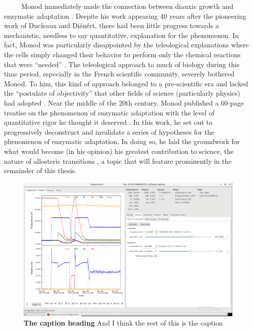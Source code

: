 \documentclass[12pt]{caltech_thesis}
\begin{document}
~~~~~Monod immediately made the connection between diauxic growth and
enzymatic adaptation \autocite{loison2013}. Despite his work appearing
40 years after the pioneering work of Ducleaux and Diénért, there had
been little progress towards a mechanistic, needless to say
quantitative, explanation for the phenomenon. In fact, Monod was
particularly disappointed by the teleological explanations where the
cells simply changed their behavior to perform only the chemical
reactions that were ``needed'' \autocite{loison2013}. The teleological
approach to much of biology during this time period, especially in the
French scientific community, severely bothered Monod. To him, this kind
of approach belonged to a pre-scientific era and lacked the ``postulate
of objectivity'' that other fields of science (particularly physics) had
adopted \autocite{loison2013}. Near the middle of the 20th century,
Monod published a 60-page treatise on the phenomenon of enzymatic
adaptation with the level of quantitative rigor he thought it deserved
\autocite{monod1947}. In this work, he set out to progressively
deconstruct and invalidate a series of hypotheses for the phenomenon of
enzymatic adaptation. In doing so, he laid the groundwork for what would
become (in his opinion) his greatest contribution to science, the nature
of allosteric transitions \autocite{loison2013,monod1963,monod1965}, a
topic that will feature prominently in the remainder of this thesis.

\hypertarget{fig:custom_figure}{%
\begin{figure}
\centering
\includegraphics[width=1\linewidth]{chapter_01/figs/fridge.PNG}
\caption[{The first short caption.}]{\textbf{The caption heading} And I
think the rest of this is the caption}
\label{fig:custom_figure}
\end{figure}
}
\end{document}
